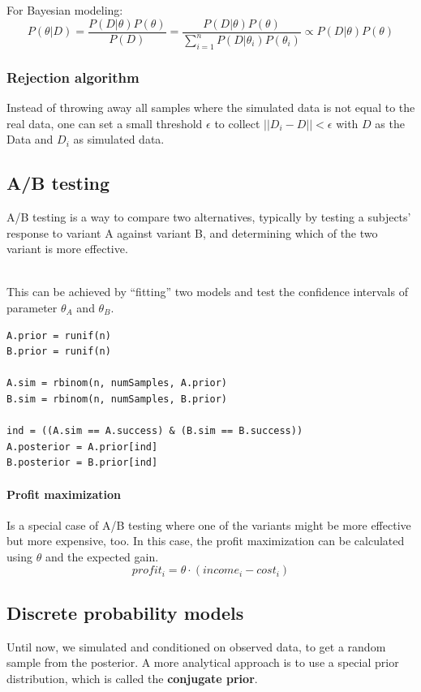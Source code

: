For Bayesian modeling:
\begin{equation*}
P(\theta|D) = \frac{P(D|\theta)P(\theta)}{P(D)} = \frac{P(D|\theta)P(\theta)}{\sum_{i=1}^{n}P(D|\theta_i)P(\theta_i)} \propto P(D|\theta)P(\theta)
\end{equation*}

\subsubsection{Rejection algorithm}
Instead of throwing away all samples where the simulated data is not equal to the real data, one can set a small threshold $\epsilon$ to collect $||D_i-D||<\epsilon$ with $D$ as the Data and $D_i$ as simulated data. 

\subsection{A/B testing}
A/B testing is a way to compare two alternatives, typically by testing a subjects' response to variant A against variant B, and determining which of the two variant is more effective.

\mbox{}\\
This can be achieved by ``fitting'' two models and test the confidence intervals of parameter $\theta_A$ and $\theta_B$.

\begin{lstlisting}
A.prior = runif(n)
B.prior = runif(n)

A.sim = rbinom(n, numSamples, A.prior)
B.sim = rbinom(n, numSamples, B.prior)

ind = ((A.sim == A.success) & (B.sim == B.success))
A.posterior = A.prior[ind]
B.posterior = B.prior[ind]
\end{lstlisting}

\paragraph{Profit maximization}
Is a special case of A/B testing where one of the variants might be more effective but more expensive, too. In this case, the profit maximization can be calculated using $\theta$ and the expected gain.
\begin{equation*}
profit_i = \theta \cdot (income_i - cost_i)
\end{equation*}

\subsection{Discrete probability models}
Until now, we simulated and conditioned on observed data, to get a random sample from the posterior. A more analytical approach is to use a special prior distribution, which is called the \textbf{conjugate prior}.

